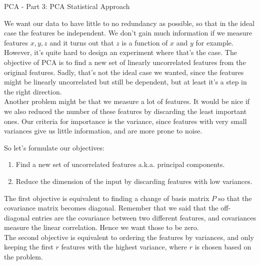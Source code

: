 \begin{entry}[4]{PCA - Part 3: PCA Statistical Approach}
\begin{entrysection}
    We want our data to have little to no redundancy as possible, so that in the ideal case the features be independent. We don't gain much information if we measure features $x, y, z$ and it turns out that $z$ is a function of $x$ and $y$ for example. However, it's quite hard to design an experiment where that's the case. The objective of PCA is to find a new set of linearly uncorrelated features from the original features. Sadly, that's not the ideal case we wanted, since the features might be linearly uncorrelated but still be dependent, but at least it's a step in the right direction. \\
    
    \noindent Another problem might be that we measure a lot of features. It would be nice if we also reduced the number of these features by discarding the least important ones. Our criteria for importance is the variance, since features with very small variances give us little information, and are more prone to noise. 
\end{entrysection}

\begin{entrysection} [Objectives]
So let's formulate our objectives:
\begin{enumerate}
    \item Find a new set of uncorrelated features a.k.a. principal components.
    \item Reduce the dimension of the input by discarding features with low variances.
\end{enumerate}
The first objective is equivalent to finding a change of basis matrix $P$ so that the covariance matrix becomes diagonal. Remember that we said that the off-diagonal entries are the covariance between two different features, and covariances measure the linear correlation. Hence we want those to be zero. \\

\noindent The second objective is equivalent to ordering the features by variances, and only keeping the first $r$ features with the highest variance, where $r$ is chosen based on the problem.
\end{entrysection}


\end{entry}
